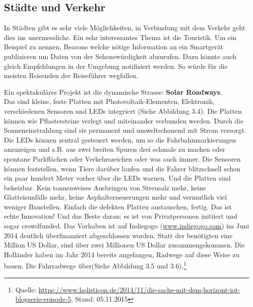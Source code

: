 \subsection{Städte und Verkehr}
In Städten gibt es sehr viele Möglichkeiten, in Verbindung mit dem Verkehr geht dies ins unermessliche.
Ein sehr interessantes Thema ist die Touristik. Um ein Beispiel zu nennen, Beacons welche nötige Information an ein Smartgerät publizieren um Daten von der Sehenswürdigkeit abzurufen. Dazu könnte auch gleich Empfehlungen in der Umgebung notifiziert werden. So würde für die meisten Reisenden der Reiseführer wegfallen.

Ein spektakuläres Projekt ist die dynamische Strasse: \textbf{Solar Roadways}.\\
Das sind kleine, feste Platten mit Photovoltaik-Elementen, Elektronik, verschiedenen Sensoren und LEDs integriert (Siehe Abbildung 3.4). Die Platten können wie Pflastersteine verlegt und miteinander verbunden werden. Durch die Sonneneinstrahlung sind sie permanent und umweltschonend mit Strom versorgt. Die LEDs können zentral gesteuert werden, um so die Fahrbahnmarkierungen anzuzeigen und z.B. aus zwei breiten Spuren drei schmale zu machen oder spontane Parkflächen oder Verkehrszeichen oder was auch immer. Die Sensoren können feststellen, wenn Tiere darüber laufen und die Fahrer blitzschnell schon ein paar hundert Meter vorher über die LEDs warnen.  Und die Platten sind beheizbar. Kein tonnenweises Ausbringen von Streusalz mehr, keine Glatteisunfälle mehr, keine Asphalterneuerungen mehr und vermutlich viel weniger Baustellen. Einfach die defekten Platten austauschen, fertig. Das ist echte Innovation! Und das Beste daran: es ist von Privatpersonen initiiert und sogar crowdfunded. Das Vorhaben ist auf Indiegogo (\url{www.indiegogo.com}) im Juni 2014 deutlich überfinanziert abgeschlossen worden. Statt der benötigten eine Million US Dollar, sind über zwei Millionen US Dollar zusammengekommen. Die Holländer haben im Jahr 2014 bereits angefangen, Radwege auf diese Weise zu bauen. Die Fahrradwege über(Siehe Abbildung 3.5 und 3.6).\footnote{Quelle: \url{https://www.holisticon.de/2014/11/die-sache-mit-dem-horizont-iot-blogserie-episode-5}, Stand: 05.11.2015}
